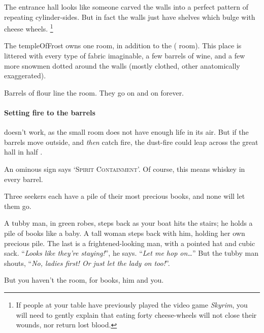 \begin{multicols}{2}
The entrance hall looks like someone carved the walls into a perfect pattern of repeating cylinder-sides.
But in fact the walls just have shelves which bulge with cheese wheels.%
\footnote{If people at your table have previously played the video game \textit{Skyrim}, you will need to gently explain that eating forty cheese-wheels will not close their wounds, nor return lost blood.}


The \gls{templeOfFrost} owns one room, in addition to the  ( room).
This place is littered with every type of fabric imaginable, a few barrels of wine, and a few more snowmen dotted around the walls (mostly clothed, other anatomically exaggerated).


Barrels of flour line the room.
They go on and on forever.

\paragraph{Setting fire to the barrels}
doesn't work, as the small room does not have enough life in its air.
But if the barrels move outside, and \emph{then} catch fire, the dust-fire could leap across the great hall in half .


An ominous sign says `\textsc{Spirit Containment}'.
Of course, this means whiskey in every barrel.



Three \glspl{seeker} each have a pile of their most precious books, and none will let them go.

\begin{boxtext}
  A tubby man, in green robes, steps back as your boat hits the stairs; he holds a pile of books like a baby.
  A tall woman steps back with him, holding her own precious pile.
  The last is a frightened-looking man, with a pointed hat and cubic sack.
  ``\textit{Looks like they're staying!}'', he says.
  ``\textit{Let me hop on\ldots}''
  But the tubby man shouts, ``\textit{No, ladies first!
  Or just let the lady on too!}''.

  But you haven't the room, for books, him and you.
\end{boxtext}


\end{multicols}
